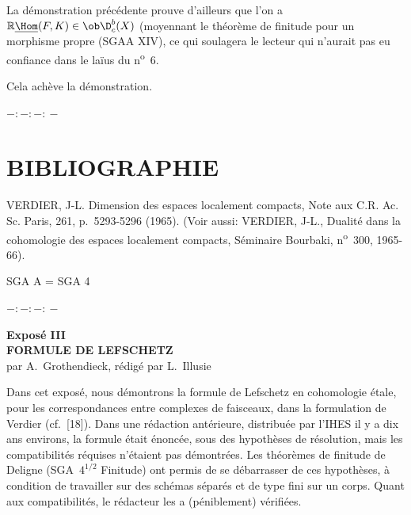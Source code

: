 La démonstration précédente prouve d'ailleurs que l'on a $\mathbb{R}\underline{\Hom}(F,K)\in\ob\D_c^b(X)$ (moyennant le théorème de finitude pour un morphisme propre (SGAA XIV), ce qui soulagera le lecteur qui n'aurait pas eu confiance dans le laïus du n\textsuperscript{o}~6.

Cela achève la démonstration.

\begin{center}
$-:\!-:\!-:\!-$
\end{center}

\section*{BIBLIOGRAPHIE}

\begin{enumerate}[label={[\arabic*]}]
\item VERDIER, J-L. Dimension des espaces localement compacts, Note aux C.R. Ac. Sc. Paris, 261, p.~5293-5296 (1965). (Voir aussi: VERDIER, J-L., Dualité dans la cohomologie des espaces localement compacts, Séminaire Bourbaki, n\textsuperscript{o}~300, 1965-66).
\end{enumerate}

SGA A = SGA 4

\begin{center}
$-:\!-:\!-:\!-$
\end{center}

\clearpage
\begin{center}
{\Large \textbf{Exposé III}}\\[0.4em]
{\large \textbf{FORMULE DE LEFSCHETZ}}\\[0.3em]
par A.~Grothendieck, rédigé par L.~Illusie
\end{center}
\renewenvironment{statement}[1]{\par\medskip\noindent\textbf{#1}\ }{\par\medskip}
\renewenvironment{prooftext}[1][Proof]{\par\noindent\emph{#1}\ }{\par\medskip}



Dans cet exposé, nous démontrons la formule de Lefschetz en cohomologie étale, pour les correspondances entre complexes de faisceaux, dans la formulation de Verdier (cf.~[18]). Dans une rédaction antérieure, distribuée par l'IHES il y a dix ans environs, la formule était énoncée, sous des hypothèses de résolution, mais les compatibilités réquises n'étaient pas démontrées. Les théorèmes de finitude de Deligne (SGA~$4^{1/2}$ Finitude) ont permis de se débarrasser de ces hypothèses, à condition de travailler sur des schémas séparés et de type fini sur un corps. Quant aux compatibilités, le rédacteur les a (péniblement) vérifiées.

